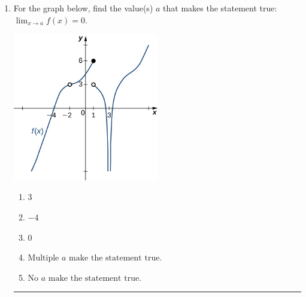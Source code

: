 \documentclass[14pt]{extbook}
\newcommand{\litem}[1]{\item#1\hspace*{-1cm}\rule{\textwidth}{0.4pt}}
\begin{document}
\begin{enumerate}
{\begin{enumerate}[label=\Alph*.]
\end{enumerate} }
\litem{
For the graph below, find the value(s) $a$ that makes the statement true: $ \displaystyle \lim_{x \rightarrow a} f(x) = 0$.
\begin{center}
    \includegraphics[width=0.5\textwidth]{../Figures/evaluateLimitGraphicallyCopyC.png}
\end{center}
\begin{enumerate}[label=\Alph*.]
\item \( 3 \)
\item \( -4 \)
\item \( 0 \)
\item \( \text{Multiple } a \text{ make the statement true}. \)
\item \( \text{No } a \text{ make the statement true}. \)

\end{enumerate} }
\end{enumerate}
\end{document}
